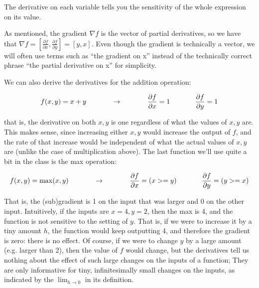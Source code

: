 The derivative on each variable tells you the sensitivity of the whole expression on its value.

As mentioned, the gradient $\nabla f$ is the vector of partial derivatives, so we have that $\nabla f = [\frac{\partial f}{\partial x}, \frac{\partial f}{\partial y}] = [y, x]$. Even though the gradient is technically a vector, we will often use terms such as ``the gradient on x” instead of the technically correct phrase ``the partial derivative on x” for simplicity.

We can also derive the derivatives for the addition operation:

\begin{equation}
f(x,y) = x + y \hspace{0.5in} \rightarrow \hspace{0.5in} \frac{\partial f}{\partial x} = 1 \hspace{0.5in} \frac{\partial f}{\partial y} = 1
\end{equation}

that is, the derivative on both $x,y$ is one regardless of what the values of $x,y$ are. This makes sense, since increasing either $x,y$ would increase the output of $f$, and the rate of that increase would be independent of what the actual values of $x,y$ are (unlike the case of multiplication above). The last function we’ll use quite a bit in the class is the max operation:

\begin{equation}
f(x,y) = \max(x, y) \hspace{0.5in} \rightarrow \hspace{0.5in} \frac{\partial f}{\partial x} = (x >= y) \hspace{0.5in} \frac{\partial f}{\partial y} = (y >= x)
\end{equation}

That is, the (sub)gradient is 1 on the input that was larger and 0 on the other input. Intuitively, if the inputs are $x=4,y=2$, then the max is 4, and the function is not sensitive to the setting of $y$. That is, if we were to increase it by a tiny amount $h$, the function would keep outputting 4, and therefore the gradient is zero: there is no effect. Of course, if we were to change $y$ by a large amount (e.g. larger than 2), then the value of $f$ would change, but the derivatives tell us nothing about the effect of such large changes on the inputs of a function; They are only informative for tiny, infinitesimally small changes on the inputs, as indicated by the $\lim_{h \rightarrow 0}$ in its definition.


